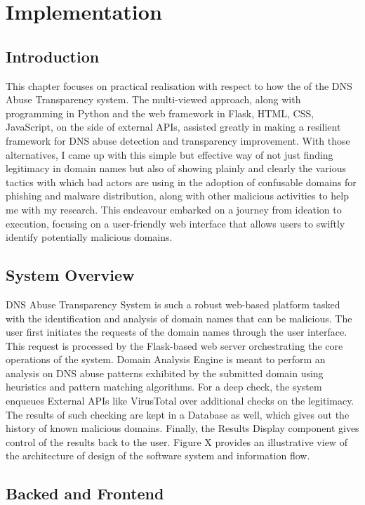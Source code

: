 \chapter{Implementation}

\section{Introduction} 

This chapter focuses on practical realisation with respect to how the of the DNS Abuse Transparency system. The multi-viewed approach, along with programming in Python and the web framework in Flask, HTML, CSS, JavaScript, on the side of external APIs, assisted greatly in making a resilient framework for DNS abuse detection and transparency improvement. With those alternatives, I came up with this simple but effective way of not just finding legitimacy in domain names but also of showing plainly and clearly the various tactics with which bad actors are using in the adoption of confusable domains for phishing and malware distribution, along with other malicious activities to help me with my research. This endeavour embarked on a journey from ideation to execution, focusing on a user-friendly web interface that allows users to swiftly identify potentially malicious domains. 

\section{System Overview}

DNS Abuse Transparency System is such a robust web-based platform tasked with the identification and analysis of domain names that can be malicious. The user first initiates the requests of the domain names through the user interface. This request is processed by the Flask-based web server orchestrating the core operations of the system. Domain Analysis Engine is meant to perform an analysis on DNS abuse patterns exhibited by the submitted domain using heuristics and pattern matching algorithms. For a deep check, the system enqueues External APIs like VirusTotal over additional checks on the legitimacy. The results of such checking are kept in a Database as well, which gives out the history of known malicious domains. Finally, the Results Display component gives control of the results back to the user. Figure X provides an illustrative view of the architecture of design of the software system and information flow.

\section{Backed and Frontend} 
